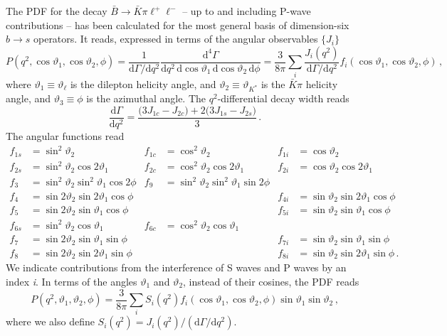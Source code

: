 \documentclass[aps,prd,reprint,nofootinbib,preprintnumbers]{revtex4}
\newcommand{\dd}{\text{d}}
\renewcommand{\theta}{\vartheta}
\begin{document}
The PDF for the decay $\bar{B}\to\bar{K}\pi\ell^+\ell^-$ -- up to and including P-wave contributions -- has been calculated
for the most general basis of dimension-six $b\to s$ operators. It reads, expressed in terms of the angular observables $\lbrace J_i\rbrace$ \cite{Blake:2012mb,Bobeth:2012vn}
\begin{equation}
    P(q^2, \cos\theta_1, \cos\theta_2, \phi) = \frac{1}{\dd\Gamma/\dd q^2} \frac{\dd^4\Gamma}{\dd q^2\,\dd \cos\theta_1\,\dd \cos\theta_2\,\dd \phi} = \frac{3}{8\pi} \sum_i \frac{J_{i}(q^2)}{\dd\Gamma/\dd q^2} f_i(\cos\theta_1, \cos\theta_2, \phi)\,,
\end{equation}
where $\theta_1 \equiv \theta_\ell$ is the dilepton helicity angle, and $\theta_2 \equiv \theta_{K^*}$ is the $\bar{K}\pi$ helicity angle, and $\theta_3 \equiv \phi$ is the azimuthal angle.
The $q^2$-differential decay width reads
\begin{equation}
    \frac{\dd\Gamma}{\dd q^2} = \frac{\big(3 J_{1c} - J_{2c}\big) + 2\big(3J_{1s} - J_{2s}\big)}{3}\,.
\end{equation}
The angular functions read \cite{Blake:2012mb,Bobeth:2012vn}
\begin{equation}
\begin{aligned}
    f_{1s} & = \sin^2\theta_2 &
    f_{1c} & = \cos^2\theta_2 &
    f_{1i} & = \cos\theta_2\\
    f_{2s} & = \sin^2\theta_2 \cos 2\theta_1 &
    f_{2c} & = \cos^2\theta_2 \cos 2\theta_1 &
    f_{2i} & = \cos\theta_2 \cos 2\theta_1\\
    f_{3}  & = \sin^2\theta_2\sin^2\theta_1 \cos 2\phi &
    f_{9}  & = \sin^2\theta_2\sin^2\theta_1 \sin 2\phi\\
    f_{4}  & = \sin 2\theta_2 \sin 2\theta_1 \cos\phi & & &
    f_{4i} & = \sin\theta_2 \sin 2\theta_1 \cos\phi\\
    f_{5}  & = \sin 2\theta_2 \sin \theta_1 \cos\phi & & &
    f_{5i} & = \sin\theta_2 \sin \theta_1 \cos\phi\\
    f_{6s} & = \sin^2\theta_2 \cos\theta_1 &
    f_{6c} & = \cos^2\theta_2 \cos\theta_1\\
    f_{7}  & = \sin 2\theta_2 \sin \theta_1 \sin\phi & & &
    f_{7i} & = \sin\theta_2 \sin \theta_1 \sin\phi\\
    f_{8}  & = \sin 2\theta_2 \sin 2\theta_1 \sin\phi & & &
    f_{8i} & = \sin\theta_2 \sin 2\theta_1 \sin\phi\,.
\end{aligned}
\end{equation}
We indicate contributions from the interference of S waves and P waves by an index \emph{i}. In terms of the angles $\theta_1$ and $\theta_2$, instead of their cosines, the PDF reads
\begin{equation}
    P(q^2, \theta_1, \theta_2, \phi) = \frac{3}{8\pi} \sum_i S_i(q^2) f_i(\cos\theta_1, \cos\theta_2, \phi) \sin\theta_1 \sin\theta_2\,,
\end{equation}
where we also define $S_i(q^2) = J_i(q^2) / (\dd\Gamma/\dd q^2)$.\\
\end{document}

